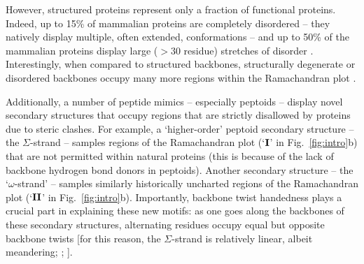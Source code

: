 \documentclass[fleqn,10pt,lineno]{wlpeerj} %
\newcommand{\n}[1]{{\color{blue}#1}}
\newcommand{\Fig}[1]{Fig.~\ref{#1}}
\begin{document}
\n{However, structured proteins represent only a fraction of functional proteins. Indeed, up to 15\% of mammalian proteins are completely disordered -- they natively display multiple, often extended, conformations \citep{Mannige2014b} -- and up to 50\% of the mammalian proteins display large ($>30$ residue) stretches of disorder \citep{Iakoucheva2002,Ward2004,Orosz2011}. Interestingly, when compared to structured backbones, structurally degenerate or disordered backbones occupy many more regions within the Ramachandran plot \citep{Beck2008}.}

\n{Additionally, a number of} peptide mimics -- especially peptoids \citep{Sun2013} -- display novel secondary structures that occupy regions that are strictly disallowed by proteins due to steric clashes. %
For example, a `higher-order' peptoid secondary structure -- the $\Sigma$-strand \citep{Mannige2015,Robertson2016} -- samples regions of the Ramachandran plot (`$\textrm{\textbf{I}}$' in \Fig{fig:intro}\n{b}) that are not permitted within natural proteins (this is because of the lack of backbone hydrogen bond donors in peptoids). Another secondary structure -- the `$\omega$-strand' \citep{Gorske2016} -- samples similarly historically uncharted regions of the Ramachandran plot (`$\textrm{\textbf{II}}$' in \Fig{fig:intro}\n{b}). Importantly, \n{backbone twist} handedness plays a crucial part in explaining these new motifs: as one goes along the backbones of these secondary structures, alternating residues occupy equal but opposite backbone twists [for this reason, the $\Sigma$-strand is relatively linear, albeit meandering; \cite{Mannige2015}; \cite{Mannige2016}].
\end{document}
